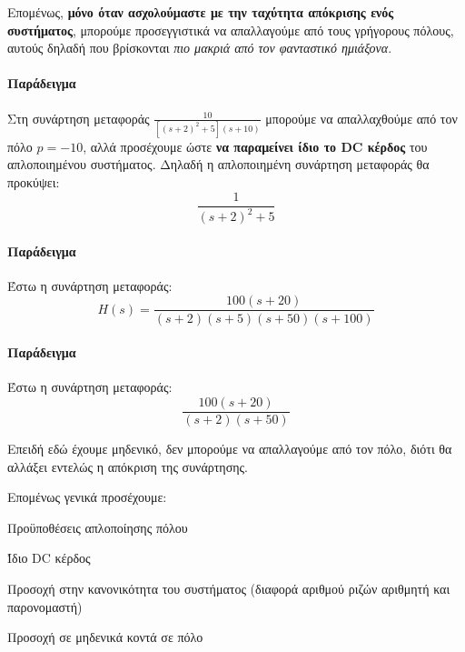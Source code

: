 \documentclass[11pt,a4paper,notitlepage,fleqn]{article}
\begin{document}
Επομένως, \textbf{μόνο όταν ασχολούμαστε με την ταχύτητα απόκρισης ενός συστήματος}, μπορούμε
προσεγγιστικά να απαλλαγούμε από τους γρήγορους πόλους, αυτούς δηλαδή που βρίσκονται
\textit{πιο μακριά από τον φανταστικό ημιάξονα}.

\paragraph{Παράδειγμα}
Στη συνάρτηση μεταφοράς \( \frac{10}{\left[(s+2)^2+5\right](s+10)} \) μπορούμε να
απαλλαχθούμε από τον πόλο \( p=-10 \), αλλά προσέχουμε ώστε \textbf{να παραμείνει ίδιο το
	DC κέρδος} του απλοποιημένου συστήματος. Δηλαδή η απλοποιημένη συνάρτηση μεταφοράς θα
προκύψει:
\[
\frac{1}{(s+2)^2+5}
\]

\paragraph{Παράδειγμα}
Έστω η συνάρτηση μεταφοράς:
\[
H(s) = \frac{100(s+20)}{(s+2)(s+5)(s+50)(s+100)}
\]

\paragraph{Παράδειγμα}
Έστω η συνάρτηση μεταφοράς:
\[
\frac{100(s+20)}{(s+2)(s+50)}
\]

Επειδή εδώ έχουμε μηδενικό, δεν μπορούμε να απαλλαγούμε από τον πόλο, διότι θα αλλάξει
εντελώς η απόκριση της συνάρτησης.

Επομένως γενικά προσέχουμε:
\begin{infobox}{Προϋποθέσεις απλοποίησης πόλου}
\begin{enumpar}
	\item Ίδιο DC κέρδος
	\item Προσοχή στην κανονικότητα του συστήματος  (διαφορά αριθμού ριζών αριθμητή και παρονομαστή)
	\item Προσοχή σε μηδενικά κοντά σε πόλο
\end{enumpar}
\end{infobox}
\end{document}
